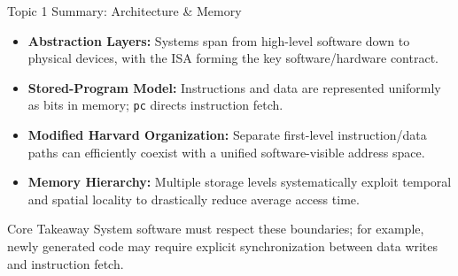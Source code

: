 \documentclass[aspectratio=169,11pt,t]{beamer}
\newcommand{\key}[1]{\textbf{#1}}
\newcommand{\bits}[1]{\texttt{#1}}
\begin{document}

\begin{frame}{Topic 1 Summary: Architecture \& Memory}

\begin{itemize}\setlength{\itemsep}{6pt}
  \item \key{Abstraction Layers:} Systems span from high-level software down to physical devices, with the ISA forming the key software/hardware contract.
  \item \key{Stored-Program Model:} Instructions and data are represented uniformly as bits in memory; \bits{pc} directs instruction fetch.
  \item \key{Modified Harvard Organization:} Separate first-level instruction/data paths can efficiently coexist with a unified software-visible address space.
  \item \key{Memory Hierarchy:} Multiple storage levels systematically exploit temporal and spatial locality to drastically reduce average access time.
\end{itemize}

\vfill
\begin{block}{Core Takeaway}
System software must respect these boundaries; for example, newly generated code may require explicit synchronization between data writes and instruction fetch.
\end{block}

\end{frame}





\end{document}
